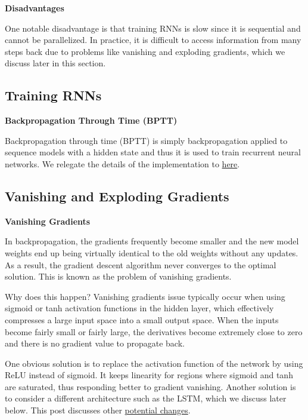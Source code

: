 \documentclass[
]{book}
\begin{document}
\textbf{Disadvantages}

One notable disadvantage is that training RNNs is slow since it is sequential and cannot be parallelized. In practice, it is difficult to access information from many steps back due to problems like vanishing and exploding gradients, which we discuss later in this section.

\hypertarget{training-rnns}{%
\subsection{Training RNNs}\label{training-rnns}}

\textbf{Backpropagation Through Time (BPTT)}

Backpropagation through time (BPTT) is simply backpropagation applied to sequence models with a hidden state and thus it is used to train recurrent neural networks. We relegate the details of the implementation to \href{https://d2l.ai/chapter_recurrent-neural-networks/bptt.html}{here}.

\hypertarget{vanishing-and-exploding-gradients}{%
\subsection{Vanishing and Exploding Gradients}\label{vanishing-and-exploding-gradients}}

\textbf{Vanishing Gradients}

In backpropagation, the gradients frequently become smaller and the new model weights end up being virtually identical to the old weights without any updates. As a result, the gradient descent algorithm never converges to the optimal solution. This is known as the problem of vanishing gradients.

Why does this happen? Vanishing gradients issue typically occur when using sigmoid or tanh activation functions in the hidden layer, which effectively compresses a large input space into a small output space. When the inputs become fairly small or fairly large, the derivatives become extremely close to zero and there is no gradient value to propagate back.

One obvious solution is to replace the activation function of the network by using ReLU instead of sigmoid. It keeps linearity for regions where sigmoid and tanh are saturated, thus responding better to gradient vanishing. Another solution is to consider a different architecture such as the LSTM, which we discuss later below. This post discusses other \href{https://datascience.stackexchange.com/questions/72351/how-to-prevent-vanishing-gradient-or-exploding-gradient}{potential changes}.
\end{document}
